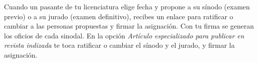 \documentclass[11pt,a4paper]{article}
\begin{document}
{\small\tableofcontents}
\newpage
\begin{quevasahacer}
Cuando un pasante de tu licenciatura elige fecha y propone a su sínodo (examen previo) o a su jurado (examen definitivo), recibes un enlace para ratificar o cambiar a las personas propuestas y firmar la asignación. Con tu firma se generan los oficios de cada sinodal. En la opción \emph{Artículo especializado para publicar en revista indizada} te toca ratificar o cambiar el sínodo y el jurado, y firmar la asignación.
\end{quevasahacer}



\end{document}
